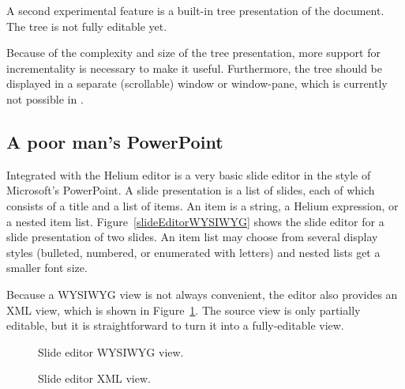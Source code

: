 
A second experimental feature is a built-in tree presentation of the document. The tree is not fully editable yet.

\begin{center}
\end{center}

Because of the complexity and size of the tree presentation, more support for incrementality is necessary to make it useful. Furthermore, the tree should be displayed in a separate (scrollable) window or window-pane, which is currently not possible in {\Xprez}.



\subsection{A poor man's PowerPoint}

Integrated with the Helium editor is a very basic slide editor in the style of Microsoft's PowerPoint. A slide presentation is a list of slides, each of which consists of a title and a list of items. An item is a string, a Helium expression, or a nested item list. Figure~\ref{slideEditorWYSIWYG} shows the slide editor for a slide presentation of two slides. An item list may choose from several display styles (bulleted, numbered, or enumerated with letters) and nested lists get a smaller font size.

Because a WYSIWYG view is not always convenient, the editor also provides an XML view, which is shown in Figure~\ref{slideEditorSource}. The source view is only partially editable, but it is straightforward to turn it into a fully-editable view. 

\begin{figure}
  \begin{minipage}[t]{.47\textwidth}
    \begin{center}   
      \caption{Slide editor WYSIWYG view.} \label{slideEditorWYSIWYG}
    \end{center}
  \end{minipage}
\hfill
  \begin{minipage}[t]{.47\textwidth}
    \begin{center}  
      \caption{Slide editor XML view.\hspace{1cm}} \label{slideEditorSource}
    \end{center}
  \end{minipage}
\end{figure}

